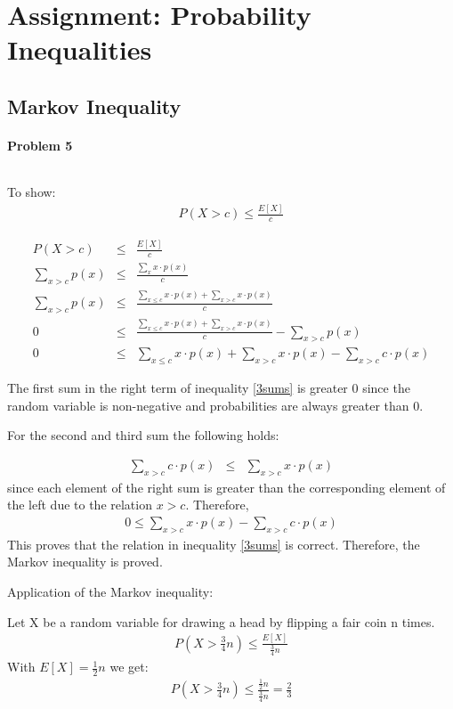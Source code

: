 \documentclass{article}
\begin{document}
\section{Assignment: Probability Inequalities}
\subsection{Markov Inequality}

\paragraph*{Problem 5}
$\;$ 

To show:
\begin{eqnarray}
P(X > c) \leq \frac{E[X]}{c}
\end{eqnarray}

\begin{eqnarray}
P(X > c) &\leq& \frac{E[X]}{c}\\
\sum_{x>c}{p(x)} &\leq& \frac{\sum_{x}{x \cdot p(x)}}{c}\\
\sum_{x>c}{p(x)} &\leq& \frac{\sum_{x\leq c}{x \cdot p(x)} + \sum_{x>c}{x \cdot p(x)}}{c}\\
0 &\leq& \frac{\sum_{x\leq c}{x \cdot p(x)} + \sum_{x>c}{x \cdot p(x)}}{c} - \sum_{x>c}{p(x)}\\
0 &\leq& \sum_{x\leq c}{x \cdot p(x)} + \sum_{x>c}{x \cdot p(x)} - \sum_{x>c}{ c \cdot p(x)} \label{3sums}
\end{eqnarray}

The first sum in the right term of inequality \ref{3sums} is greater 0 since the random variable is non-negative and probabilities are always greater than 0.

For the second and third sum the following holds:

\begin{eqnarray}
\sum_{x>c}{ c \cdot p(x)} &\leq& \sum_{x>c}{x \cdot p(x)}
\end{eqnarray}
since each element of the right sum is greater than the corresponding element of the left due to the relation $x > c$. Therefore,
\begin{eqnarray}
0 \leq \sum_{x>c}{x \cdot p(x)} - \sum_{x>c}{ c \cdot p(x)}
\end{eqnarray}
This proves that the relation in inequality \ref{3sums} is correct. Therefore, the Markov inequality is proved.

Application of the Markov inequality:

Let X be a random variable for drawing a head by flipping a fair coin n times.
\begin{eqnarray}
P(X > \frac{3}{4}n) \leq \frac{E[X]}{\frac{3}{4}n}
\end{eqnarray}
With $E[X] = \frac{1}{2}n$ we get:
\begin{eqnarray}
P(X > \frac{3}{4}n) \leq \frac{\frac{1}{2}n}{\frac{3}{4}n} = \frac{2}{3}
\end{eqnarray}
\end{document}

